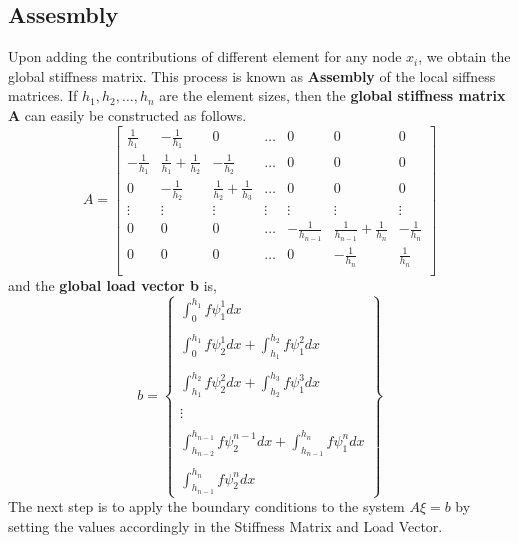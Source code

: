 \subsection{Assesmbly}
Upon adding the contributions of different element for any node $x_i$, we obtain the global stiffness matrix. This process is known as \textbf{Assembly} of the local siffness matrices. If $h_1, h_2, \dots, h_n$ are the element sizes, then the \textbf{global stiffness matrix A}  can easily be constructed as follows.
\begin{equation}
A = 
\begin{bmatrix}
\frac{1}{h_1} & -\frac{1}{h_1} & 0 & \dots & 0 & 0 & 0\\
-\frac{1}{h_1} & 	\frac{1}{h_1} + \frac{1}{h_2} & -\frac{1}{h_2} & \dots & 0 & 0 & 0\\
0 & 	-\frac{1}{h_2} & 	\frac{1}{h_2} + \frac{1}{h_3} & \dots & 0 & 0 & 0\\
\vdots & \vdots & \vdots & \vdots & \vdots & \vdots & \vdots\\
0 & 0 & 0 & \dots & -\frac{1}{h_{n-1}}  & \frac{1}{h_{n-1}} + \frac{1}{h_n} & 	-\frac{1}{h_n} \\
0 & 0 & 0 & \dots & 0  & -\frac{1}{h_n}  & \frac{1}{h_n} \\
\end{bmatrix} \label{assemA}
\end{equation}
and the \textbf{global load vector b} is,
\begin{equation}
b = 
\begin{Bmatrix}
\int_{0}^{h_1} f \psi_1^1 dx\\\\
\int_{0}^{h_1} f \psi_2^1 dx + \int_{h_1}^{h_2} f \psi_1^2 dx\\\\
\int_{h_1}^{h_2} f \psi_2^2 dx + \int_{h_2}^{h_3} f \psi_1^3 dx\\\\
\vdots\\\\
\int_{h_{n-2}}^{h_{n-1}} f \psi_2^{n-1} dx + \int_{h_{n-1}}^{h_n} f \psi_1^n dx\\\\
\int_{h_{n-1}}^{h_n} f \psi_2^n dx

\end{Bmatrix}\label{assemb}
\end{equation}
The next step is to apply the boundary conditions to the system $A \xi = b$ by setting the values accordingly in the Stiffness Matrix and Load Vector.\\


